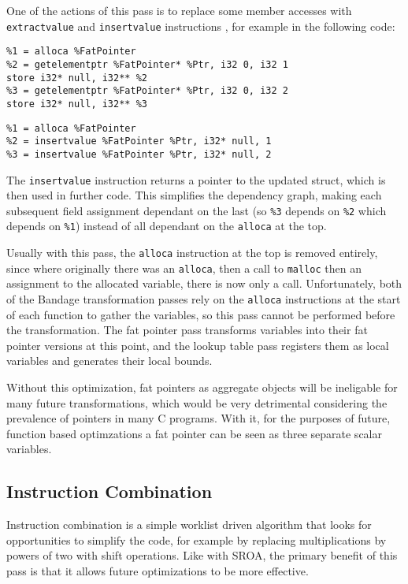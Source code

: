 One of the actions of this pass is to replace some member accesses with \verb!extractvalue! and \verb!insertvalue! instructions \cite{llvmSROA}, for example in the following code:

\begin{verbatim}
%1 = alloca %FatPointer
%2 = getelementptr %FatPointer* %Ptr, i32 0, i32 1
store i32* null, i32** %2
%3 = getelementptr %FatPointer* %Ptr, i32 0, i32 2
store i32* null, i32** %3
\end{verbatim}

\begin{verbatim}
%1 = alloca %FatPointer
%2 = insertvalue %FatPointer %Ptr, i32* null, 1
%3 = insertvalue %FatPointer %Ptr, i32* null, 2
\end{verbatim}

The \verb!insertvalue! instruction returns a pointer to the updated struct, which is then used in further code.
This simplifies the dependency graph, making each subsequent field assignment dependant on the last (so \verb!%3! depends on \verb!%2! which depends on \verb!%1!) instead of all dependant on the \verb!alloca! at the top.

Usually with this pass, the \verb!alloca! instruction at the top is removed entirely, since where originally there was an \verb!alloca!, then a call to \verb!malloc! then an assignment to the allocated variable, there is now only a call.
Unfortunately, both of the Bandage transformation passes rely on the \verb!alloca! instructions at the start of each function to gather the variables, so this pass cannot be performed before the transformation.
The fat pointer pass transforms variables into their fat pointer versions at this point, and the lookup table pass registers them as local variables and generates their local bounds.

Without this optimization, fat pointers as aggregate objects will be ineligable for many future transformations, which would be very detrimental considering the prevalence of pointers in many C programs.
With it, for the purposes of future, function based optimzations a fat pointer can be seen as three separate scalar variables.

\subsection{Instruction Combination}

Instruction combination is a simple worklist driven algorithm that looks for opportunities to simplify the code, for example by replacing multiplications by powers of two with shift operations.
Like with SROA, the primary benefit of this pass is that it allows future optimizations to be more effective.

